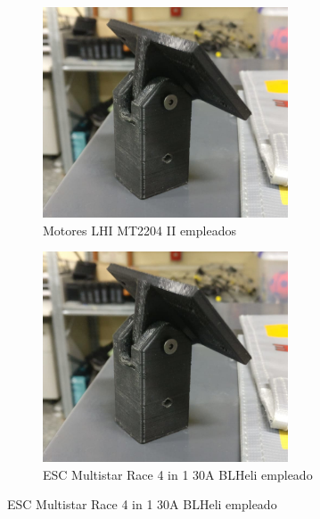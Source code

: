 \begin{itemize}
	\begin{figure}[htb!]
		\centering
		\begin{subfigure}{0.4\textwidth}
			\centering
			\includegraphics[width=0.8\textwidth,height=0.2\textheight]{hardware/rotulaPitch1.jpeg}
			\caption{Motores LHI MT2204 II empleados}
			\label{c}
		\end{subfigure}
		\begin{subfigure}{0.4\textwidth}
			\centering
			\includegraphics[width=0.8\textwidth,height=0.2\textheight]{hardware/rotulaPitch1.jpeg}
			\caption{ESC Multistar Race 4 in 1 30A BLHeli empleado}
			\label{d}
		\end{subfigure}
	\end{figure}
	
	
	
\end{itemize}




